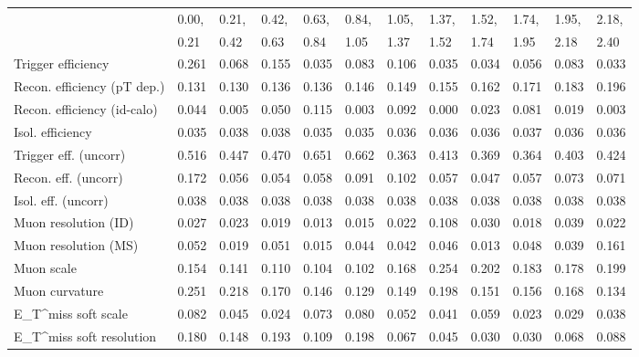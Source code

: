 \begin{tabular}{l|p{0.6cm}p{0.6cm}p{0.6cm}p{0.6cm}p{0.6cm}p{0.6cm}p{0.6cm}p{0.6cm}p{0.6cm}p{0.6cm}p{0.6cm}}
\hline
   & 0.00, & 0.21, & 0.42, & 0.63, & 0.84, & 1.05, & 1.37, & 1.52, & 1.74, & 1.95, & 2.18,  \\ 
   & 0.21 & 0.42 & 0.63 & 0.84 & 1.05 & 1.37 & 1.52 & 1.74 & 1.95 & 2.18 & 2.40  \\ 
\hline
Trigger efficiency                       & 0.261 & 0.068 & 0.155 & 0.035 & 0.083 & 0.106 & 0.035 & 0.034 & 0.056 & 0.083 & 0.033 \\
Recon. efficiency (pT dep.)              & 0.131 & 0.130 & 0.136 & 0.136 & 0.146 & 0.149 & 0.155 & 0.162 & 0.171 & 0.183 & 0.196 \\
Recon. efficiency (id-calo)              & 0.044 & 0.005 & 0.050 & 0.115 & 0.003 & 0.092 & 0.000 & 0.023 & 0.081 & 0.019 & 0.003 \\
Isol. efficiency                         & 0.035 & 0.038 & 0.038 & 0.035 & 0.035 & 0.036 & 0.036 & 0.036 & 0.037 & 0.036 & 0.036 \\
Trigger eff. (uncorr)                    & 0.516 & 0.447 & 0.470 & 0.651 & 0.662 & 0.363 & 0.413 & 0.369 & 0.364 & 0.403 & 0.424 \\
Recon. eff. (uncorr)                     & 0.172 & 0.056 & 0.054 & 0.058 & 0.091 & 0.102 & 0.057 & 0.047 & 0.057 & 0.073 & 0.071 \\
Isol. eff. (uncorr)                      & 0.038 & 0.038 & 0.038 & 0.038 & 0.038 & 0.038 & 0.038 & 0.038 & 0.038 & 0.038 & 0.038 \\
Muon resolution (ID)                     & 0.027 & 0.023 & 0.019 & 0.013 & 0.015 & 0.022 & 0.108 & 0.030 & 0.018 & 0.039 & 0.022 \\
Muon resolution (MS)                     & 0.052 & 0.019 & 0.051 & 0.015 & 0.044 & 0.042 & 0.046 & 0.013 & 0.048 & 0.039 & 0.161 \\
Muon scale                               & 0.154 & 0.141 & 0.110 & 0.104 & 0.102 & 0.168 & 0.254 & 0.202 & 0.183 & 0.178 & 0.199 \\
Muon curvature                           & 0.251 & 0.218 & 0.170 & 0.146 & 0.129 & 0.149 & 0.198 & 0.151 & 0.156 & 0.168 & 0.134 \\
E_{T}^{miss} soft scale                  & 0.082 & 0.045 & 0.024 & 0.073 & 0.080 & 0.052 & 0.041 & 0.059 & 0.023 & 0.029 & 0.038 \\
E_{T}^{miss} soft resolution             & 0.180 & 0.148 & 0.193 & 0.109 & 0.198 & 0.067 & 0.045 & 0.030 & 0.030 & 0.068 & 0.088 \\

\end{tabular}
